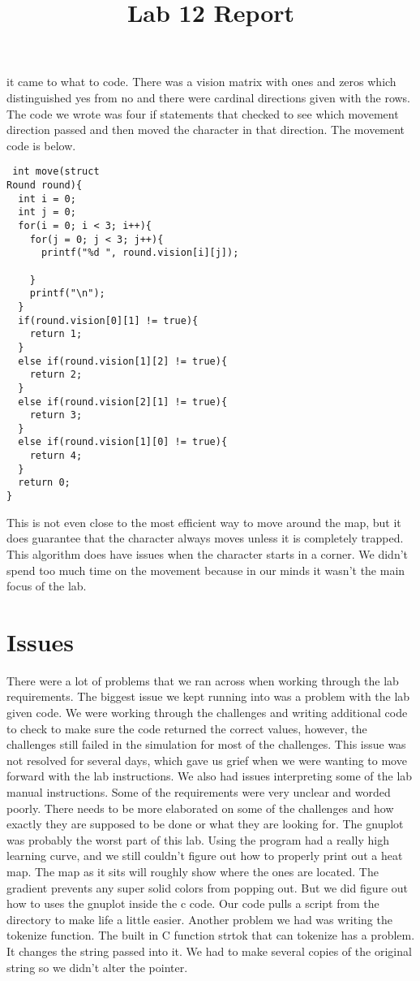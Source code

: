 \documentclass{article} \usepackage[utf8]{inputenc} \title{Lab 12 Report}
\begin{document}
it came to what to code. There was a vision matrix with ones and zeros 
which distinguished yes from no and there were cardinal directions given 
with the rows. The code we wrote was four if statements that checked to 
see which movement direction passed and then moved the character in that 
direction. The movement code is below. \begin{lstlisting} int move(struct 
Round round){
  int i = 0;
  int j = 0;
  for(i = 0; i < 3; i++){
    for(j = 0; j < 3; j++){
      printf("%d ", round.vision[i][j]);
   
    }
    printf("\n");
  }
  if(round.vision[0][1] != true){
    return 1;
  }
  else if(round.vision[1][2] != true){
    return 2;
  }
  else if(round.vision[2][1] != true){
    return 3;
  }
  else if(round.vision[1][0] != true){
    return 4;
  }
  return 0;
}
\end{lstlisting} This is not even close to the most efficient way to move 
around the map, but it does guarantee that the character always moves 
unless it is completely trapped. This algorithm does have issues when the 
character starts in a corner. We didn't spend too much time on the 
movement because in our minds it wasn't the main focus of the lab. 
\section*{Issues} There were a lot of problems that we ran across when 
working through the lab requirements. The biggest issue we kept running 
into was a problem with the lab given code. We were working through the 
challenges and writing additional code to check to make sure the code 
returned the correct values, however, the challenges still failed in the 
simulation for most of the challenges. This issue was not resolved for 
several days, which gave us grief when we were wanting to move forward 
with the lab instructions. We also had issues interpreting some of the lab 
manual instructions. Some of the requirements were very unclear and worded 
poorly. There needs to be more elaborated on some of the challenges and 
how exactly they are supposed to be done or what they are looking for. 
\newline \indent The gnuplot was probably the worst part of this lab. 
Using the program had a really high learning curve, and we still couldn't 
figure out how to properly print out a heat map. The map as it sits will 
roughly show where the ones are located. The gradient prevents any super 
solid colors from popping out. But we did figure out how to uses the 
gnuplot inside the c code. Our code pulls a script from the directory to 
make life a little easier. \newline \indent Another problem we had was 
writing the tokenize function. The built in C function strtok that can 
tokenize has a problem. It changes the string passed into it. We had to 
make several copies of the original string so we didn't alter the pointer. 
\end{document}
